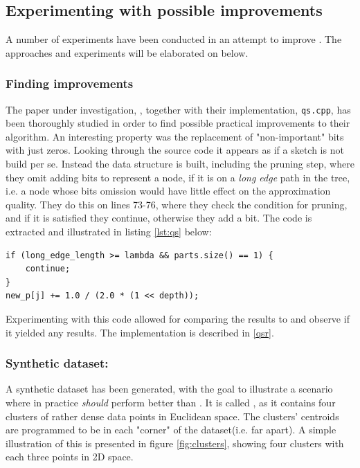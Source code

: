 \subsection{Experimenting with possible improvements}
\label{possible_improvements}
A number of experiments have been conducted in an attempt to improve \qs{}. The approaches and experiments will be elaborated on below.

\subsubsection{Finding improvements}
\label{finding_improvements}
The paper under investigation, \cite{wagner17}, together with their implementation, \texttt{qs.cpp}, has been thoroughly studied in order to find possible practical improvements to their algorithm. An interesting property was the replacement of "non-important" bits with just zeros. Looking through the source code it appears as if a sketch is not build per se. Instead the \qt{} data structure is built, including the pruning step, where they omit adding bits to represent a node, if it is on a \textit{long edge} path in the tree, i.e. a node whose bits omission would have little effect on the approximation quality\cite[p. 3, l. 14]{wagner17}. They do this on lines 73-76, where they check the condition for pruning, and if it is satisfied they continue, otherwise they add a bit. The code is extracted and illustrated in listing \ref{lst:qs} below:

\begin{lstlisting}[caption={Pruning},label={lst:qs}]
if (long_edge_length >= lambda && parts.size() == 1) {
	continue;
}
new_p[j] += 1.0 / (2.0 * (1 << depth));
\end{lstlisting}

Experimenting with this code allowed for comparing the results to \qs{} and observe if it yielded any results. The implementation is described in \ref{qsr}.


\subsubsection{Synthetic dataset: \clust{}}
\label{clusters}
A synthetic dataset has been generated, with the goal to illustrate a scenario where \qsr{} in practice \textit{should} perform better than \qs{}. It is called \clust{}, as it contains four clusters of rather dense data points in Euclidean space. The clusters' centroids are programmed to be in each "corner" of the dataset(i.e. far apart). A simple illustration of this is presented in figure \ref{fig:clusters}, showing four clusters with each three points in 2D space.

